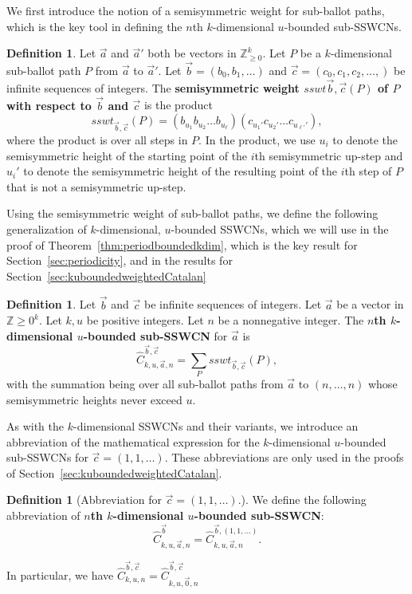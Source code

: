 \documentclass[11pt]{article}
\theoremstyle{remark}
\theoremstyle{definition}
\newtheorem{definition}[theorem]{Definition}
\begin{document}
We first introduce the notion of a semisymmetric weight for sub-ballot paths, which is the key tool in defining the $n$th $k$-dimensional $u$-bounded sub-SSWCNs.
\begin{definition}
\label{defn:weightsSSWTsubballot}
Let $\vec{a}$ and $ \vec{a}'$ both be vectors in $ \mathbb{Z}_{\geq 0}^k$. Let $P$ be a $k$-dimensional sub-ballot path $P$ from $\vec{a}$ to $\vec{a}'$. Let $\vec{b}= (b_0, b_1, \dots)$ and $ \vec{c} = (c_0, c_1, c_2, \dots, )$ be infinite sequences of integers. The \textbf{semisymmetric weight $sswt{\vec{b}, \vec{c}}(P)$ of $P$ with respect to $\vec{b}$ and $\vec{c}$} is the product $$sswt_{\vec{b}, \vec{c}}(P) = (b_{u_1}b_{u_2}\dots b_{u_{\ell}})(c_{u_1'}c_{u_2'}\dots c_{u_{\ell'}'}),$$ where the product is over all steps in $P$. In the product, we use $u_i$ to denote the semisymmetric height of the starting point of the $i$th semisymmetric up-step and  $u_{i}'$ to denote the semisymmetric height of the resulting point of the $i$th step of $P$ that is not a semisymmetric up-step.
\end{definition}

Using the semisymmetric weight of sub-ballot paths, we define the following generalization of $k$-dimensional, $u$-bounded SSWCNs, which we will use in the proof of Theorem~\ref{thm:periodboundedkdim}, which is the key result for Section~\ref{sec:periodicity}, and in the results for Section~\ref{sec:kuboundedweightedCatalan}
\begin{definition}\label{def:subSSWCN}
Let $\vec{b}$ and $\vec{c}$ be infinite sequences of integers. Let $\vec{a}$ be a vector in $\mathbb{Z}{\geq 0}^k$. Let $k, u$ be positive integers. Let $n $ be a nonnegative integer. The \textbf{$n$th $k$-dimensional $u$-bounded sub-SSWCN} for $\vec{a}$ is $$\widehat{C}_{k, u, \vec{a}, n}^{\vec{b}, \vec{c}} = \sum_{P}sswt_{\vec{b}, \vec{c}}(P),$$ with the summation being over all sub-ballot paths from $\vec{a}$ to $(n, \dots, n)$ whose semisymmetric heights never exceed $u$.
\end{definition}

As with the $k$-dimensional SSWCNs and their variants, we introduce an abbreviation of the mathematical expression for the $k$-dimensional $u$-bounded sub-SSWCNs for $\vec{c} = (1, 1, \dots)$. These abbreviations are only used in the proofs of Section~\ref{sec:kuboundedweightedCatalan}.

\begin{definition}[Abbreviation for $\vec{c} = (1, 1, \dots)$.]\label{def:abbrvSumSub}
We define the following abbreviation of \textbf{$n$th $k$-dimensional $u$-bounded sub-SSWCN}:
$$\widehat{C}_{k, u, \vec{a}, n}^{\vec{b}} = \widehat{C}_{k, u, \vec{a}, n}^{\vec{b}, (1, 1, \dots)}.$$
\end{definition}
In particular, we have $\widehat{C}_{k, u,n}^{\vec{b}, \vec{c}} = \widehat{C}_{k, u, \vec{0}, n}^{\vec{b}, \vec{c}}$
\end{document}
